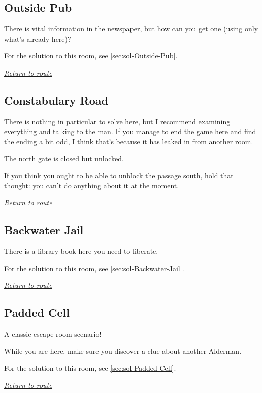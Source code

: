 \documentclass[a5paper]{extarticle}
\begin{document}
\newpage
\subsection{Outside Pub}\label{sec:req-Outside-Pub}

There is vital information in the newspaper,
but how can you get one (using only what's already here)?

For the solution to this room, see \cref{sec:sol-Outside-Pub}.

\hyperref[sec:route-2]{\emph{Return to route}}

\newpage
\subsection{Constabulary Road}\label{sec:req-Constabulary-Road}

There is nothing in particular to solve here, but I recommend examining
everything and talking to the man. If you manage to end the game here and
find the ending a bit odd, I think that's because it has leaked in from another
room.

The north gate is closed but unlocked.

If you think you ought to be able to unblock the passage south,
hold that thought: you can't do anything about it at the moment.

\hyperref[sec:route-2]{\emph{Return to route}}

\newpage
\subsection{Backwater Jail}\label{sec:req-Backwater-Jail}

There is a library book here you need to liberate.

For the solution to this room, see \cref{sec:sol-Backwater-Jail}.

\hyperref[sec:route-2]{\emph{Return to route}}

\newpage
\subsection{Padded Cell}\label{sec:req-Padded-Cell}

A classic escape room scenario!

While you are here, make sure you discover a clue about another Alderman.

For the solution to this room, see \cref{sec:sol-Padded-Cell}.

\hyperref[sec:route-2]{\emph{Return to route}}
\end{document}
